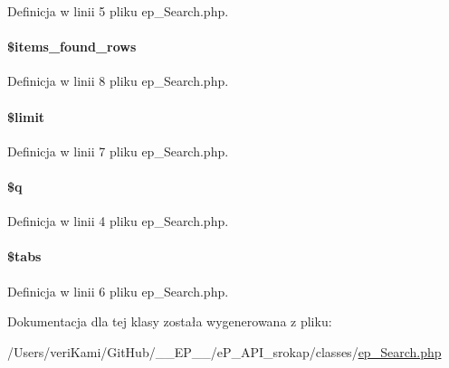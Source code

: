 Definicja w linii 5 pliku ep\-\_\-\-Search.\-php.

\hypertarget{classep___search_a65539c516b1dfa0af15bb2bab190193b}{
\paragraph[{\$items\-\_\-found\-\_\-rows}]{\setlength{\rightskip}{0pt plus 5cm}\$items\-\_\-found\-\_\-rows}}\label{classep___search_a65539c516b1dfa0af15bb2bab190193b}


Definicja w linii 8 pliku ep\-\_\-\-Search.\-php.

\hypertarget{classep___search_ae05862a0294251c88629b141b5ce329a}{
\paragraph[{\$limit}]{\setlength{\rightskip}{0pt plus 5cm}\$limit}}\label{classep___search_ae05862a0294251c88629b141b5ce329a}


Definicja w linii 7 pliku ep\-\_\-\-Search.\-php.

\hypertarget{classep___search_abb0f8f809252372e25f48d52b63ef29d}{
\paragraph[{\$q}]{\setlength{\rightskip}{0pt plus 5cm}\$q}}\label{classep___search_abb0f8f809252372e25f48d52b63ef29d}


Definicja w linii 4 pliku ep\-\_\-\-Search.\-php.

\hypertarget{classep___search_ab6ac9b33076d715d3f1376b426e25da0}{
\paragraph[{\$tabs}]{\setlength{\rightskip}{0pt plus 5cm}\$tabs}}\label{classep___search_ab6ac9b33076d715d3f1376b426e25da0}


Definicja w linii 6 pliku ep\-\_\-\-Search.\-php.



Dokumentacja dla tej klasy została wygenerowana z pliku\-:\begin{DoxyCompactItemize}
\item 
/\-Users/veri\-Kami/\-Git\-Hub/\-\_\-\-\_\-\-E\-P\-\_\-\-\_\-/e\-P\-\_\-\-A\-P\-I\-\_\-srokap/classes/\hyperlink{ep___search_8php}{ep\-\_\-\-Search.\-php}\end{DoxyCompactItemize}
